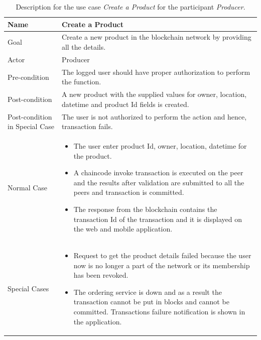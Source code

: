 \documentclass[
  a4paper,  %
  twoside,  %
  bibliography=totoc,
  headsepline,
  cleardoublepage=empty,
  parskip=half,
  draft=false
]{scrbook}
\begin{document}
\begin{table}[t!]
\begin{center}
    \begin{tabular}{ | l | p{9cm} |}
    \hline
    \textbf{Name} & \textbf{Create a Product} \\ \hline
    Goal & Create a new product in the blockchain network by providing all the details. \\ \hline
    Actor & Producer \\ \hline
    Pre-condition & The logged user should have proper authorization to perform the function. \\ \hline
    Post-condition & A new product with the supplied values for owner, location, datetime and product Id fields is created. \\ \hline
    Post-condition in Special Case & The user is not authorized to perform the action and hence, transaction fails.\\ \hline
    Normal Case & \begin{itemize}
        \item The user enter product Id, owner, location, datetime for the product.
        \item A chaincode invoke transaction is executed on the peer and the results after validation are submitted to all the peers and transaction is committed.
        \item The response from the blockchain contains the transaction Id of the transaction and it is displayed on the web and mobile application.
    \end{itemize} \\ \hline
    Special Cases & \begin{itemize}
        \item Request to get the product details failed because the user now is no longer a part of the network or its membership has been revoked.
        \item The ordering service is down and as a result the transaction cannot be put in blocks and cannot be committed. Transactions failure notification is shown in the application.
    \end{itemize}\\ \hline
    \end{tabular}
\end{center}
\caption{Description for the use case \textit{Create a Product} for the participant \textit{Producer}.}
    \label{tab:uc3}
\end{table}
\end{document}
